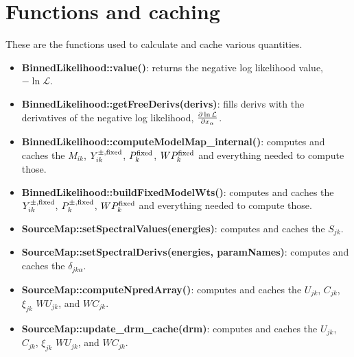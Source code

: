 \documentclass[preprint]{aastex}
\begin{document}
\section{Functions and caching}

These are the functions used to calculate and cache various quantities.

\begin{itemize}
\item{ {\bf BinnedLikelihood::value()}: returns the negative log likelihood value, $-\ln \mathcal{L}$.}
\item{ {\bf BinnedLikelihood::getFreeDerivs(derivs)}: fills derivs with the derivatives of the 
    negative log likelihood, $\frac{\partial \-\ln \mathcal{L}}{\partial x_{\alpha}}$.}
\item{ {\bf BinnedLikelihood::computeModelMap\_internal()}: computes and caches the $M_{ik}$, $Y_{ik}^{\pm,\rm fixed}$, $P_{k}^{\rm fixed}$,
    $WP_{k}^{\rm fixed}$ and everything needed to compute those.}
\item{ {\bf BinnedLikelihood::buildFixedModelWts()}: computes and caches the $Y_{ik}^{\pm,\rm fixed}$, $P_{k}^{\pm, \rm fixed}$,
    $WP_{k}^{\rm fixed}$ and everything needed to compute those.}
\item{ {\bf SourceMap::setSpectralValues(energies)}: computes and caches the $S_{jk}$.}
\item{ {\bf SourceMap::setSpectralDerivs(energies, paramNames)}: computes and caches the $\delta_{jk\alpha}$.}
\item{ {\bf SourceMap::computeNpredArray()}: computes and caches the $U_{jk}$, $C_{jk}$, $\xi_{jk}$ $WU_{jk}$, and $WC_{jk}$.}
\item{ {\bf SourceMap::update\_drm\_cache(drm)}: computes and caches the $U_{jk}$, $C_{jk}$, $\xi_{jk}$ $WU_{jk}$, and $WC_{jk}$.}
\end{itemize}
\end{document}
